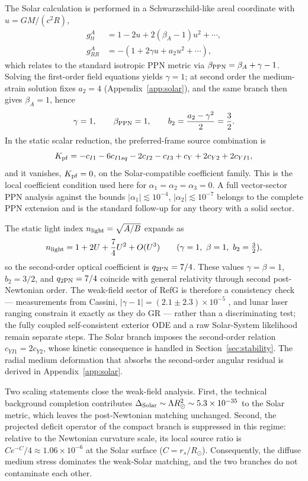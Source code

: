 \documentclass[12pt,a4paper]{article}
\begin{document}
The Solar calculation is performed in a Schwarzschild-like areal coordinate
with $u=GM/(c^2R)$,
\begin{align*}
g_{tt}^{A}&=1-2u+2(\beta_A-1)u^2+\cdots,\\
g_{RR}^{A}&=-(1+2\gamma u+a_2u^2+\cdots),
\end{align*}
which relates to the standard isotropic PPN metric via
$\beta_{\rm PPN}=\beta_A+\gamma-1$. Solving the first-order field equations
yields $\gamma=1$; at second order the medium-strain solution fixes $a_2=4$
(Appendix~\ref{app:solar}), and the same branch then gives $\beta_A=1$, hence
\[
\gamma=1,\qquad \beta_{\rm PPN}=1,\qquad b_2=\frac{a_2-\gamma^2}{2}=\frac32 .
\]
In the static scalar reduction, the preferred-frame source combination is
\[
K_{\rm pf}
=-c_{I1}-6c_{I1sq}-2c_{I2}-c_{I3}+c_Y+2c_{Y2}+2c_{YI1},
\]
and it vanishes, $K_{\rm pf}=0$, on the Solar-compatible coefficient family.
This is the local coefficient condition used here for
$\alpha_1=\alpha_2=\alpha_3=0$. A full vector-sector PPN analysis against the
bounds $|\alpha_1|\lesssim10^{-4}$, $|\alpha_2|\lesssim10^{-7}$
\cite{Will2014,WillNordtvedt1972,Kostelecky2011} belongs to the complete PPN
extension and is the standard follow-up for any theory with a solid sector.

The static light index $n_{\rm light}=\sqrt{A/B}$ expands as
\[
n_{\rm light}=1+2U+\frac74U^2+O(U^3)
\qquad(\gamma=1,\ \beta=1,\ b_2=\tfrac32),
\]
so the second-order optical coefficient is $q_{2{\rm PN}}=7/4$. These values
$\gamma=\beta=1$, $b_2=3/2$, and
$q_{2{\rm PN}}=7/4$ coincide with general relativity through second
post-Newtonian order. The weak-field sector of RefG is therefore a
consistency check --- measurements from Cassini,
$|\gamma-1|=(2.1\pm2.3)\times10^{-5}$ \cite{Bertotti2003}, and lunar laser
ranging constrain it exactly as they do GR --- rather than a discriminating
test; the fully coupled self-consistent exterior ODE and a raw Solar-System
likelihood remain separate steps. The Solar branch imposes the second-order
relation $c_{YI1}=2c_{Y2}$, whose kinetic consequence is handled in
Section~\ref{sec:stability}. The radial medium deformation that absorbs the
second-order angular residual is derived in Appendix~\ref{app:solar}.

Two scaling statements close the weak-field analysis. First, the technical
background
completion contributes $\Delta_{\rm Solar}\sim\Lambda R_\odot^2\sim
5.3\times10^{-35}$ to the Solar metric, which leaves the post-Newtonian
matching unchanged. Second, the projected deficit operator of the compact
branch is suppressed in this regime: relative to the Newtonian curvature
scale, its local
source ratio is $Ce^{-C}/4\approx1.06\times10^{-6}$ at the Solar surface
($C=r_s/R_\odot$). Consequently, the diffuse medium stress dominates the
weak-Solar matching, and the two branches do not contaminate each other.
\end{document}
